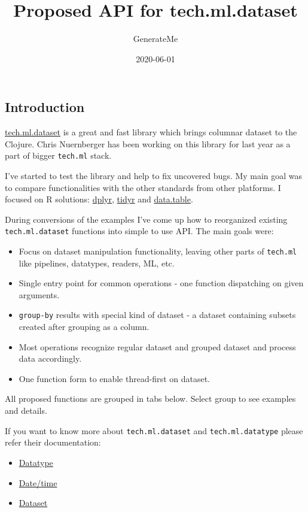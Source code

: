 \documentclass[]{article}
\title{Proposed API for tech.ml.dataset}
\author{GenerateMe}
\date{2020-06-01}
\providecommand{\tightlist}{%
  \setlength{\itemsep}{0pt}\setlength{\parskip}{0pt}}
\begin{document}
\maketitle

\subsection{Introduction}\label{introduction}

\href{https://github.com/techascent/tech.ml.dataset}{tech.ml.dataset} is
a great and fast library which brings columnar dataset to the Clojure.
Chris Nuernberger has been working on this library for last year as a
part of bigger \texttt{tech.ml} stack.

I've started to test the library and help to fix uncovered bugs. My main
goal was to compare functionalities with the other standards from other
platforms. I focused on R solutions:
\href{https://dplyr.tidyverse.org/}{dplyr},
\href{https://tidyr.tidyverse.org/}{tidyr} and
\href{https://rdatatable.gitlab.io/data.table/}{data.table}.

During conversions of the examples I've come up how to reorganized
existing \texttt{tech.ml.dataset} functions into simple to use API. The
main goals were:

\begin{itemize}
\tightlist
\item
  Focus on dataset manipulation functionality, leaving other parts of
  \texttt{tech.ml} like pipelines, datatypes, readers, ML, etc.
\item
  Single entry point for common operations - one function dispatching on
  given arguments.
\item
  \texttt{group-by} results with special kind of dataset - a dataset
  containing subsets created after grouping as a column.
\item
  Most operations recognize regular dataset and grouped dataset and
  process data accordingly.
\item
  One function form to enable thread-first on dataset.
\end{itemize}

All proposed functions are grouped in tabs below. Select group to see
examples and details.

If you want to know more about \texttt{tech.ml.dataset} and
\texttt{tech.ml.datatype} please refer their documentation:

\begin{itemize}
\tightlist
\item
  \href{https://github.com/techascent/tech.datatype/blob/master/docs/cheatsheet.md}{Datatype}
\item
  \href{https://github.com/techascent/tech.datatype/blob/master/docs/datetime.md}{Date/time}
\item
  \href{https://github.com/techascent/tech.ml.dataset/blob/master/docs/walkthrough.md}{Dataset}
\end{itemize}
\end{document}
